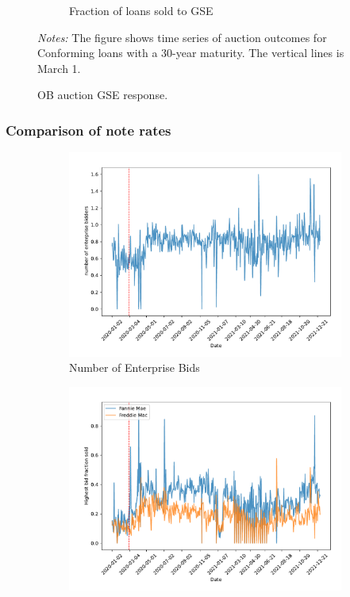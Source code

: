 \documentclass[11pt,a4paper]{article}
\begin{document}
\begin{figure}[h]
\begin{subfigure}[b]{0.49\textwidth}
      \caption{ Fraction of loans sold to GSE}
     \end{subfigure}
     \caption{OB auction  GSE response. } 
   \begin{minipage}{\textwidth}
      \footnotesize{\textit{Notes:} The figure shows time series of auction outcomes for Conforming loans with a 30-year maturity. The vertical lines is March 1.  } 
      \end{minipage}
\end{figure}


\pagebreak
\subsubsection{Comparison of note rates}

\begin{figure}[h]
  \centering
  \begin{subfigure}[b]{0.49\textwidth}
      \includegraphics[width=0.998\textwidth]{../results/figures/Number of Enterprise Bidders_mean_mat30_loan1_timeseries_nr_3_3.75.pdf}
      \caption{Number of Enterprise Bids}
     \end{subfigure}
     \begin{subfigure}[b]{0.49\textwidth}
      \includegraphics[width=0.998\textwidth]{../results/figures/sold_FreddieBid_mean_mat30_loan1_timeseries_nr_3_3.75.pdf}

\end{subfigure}
\end{figure}
\end{document}
